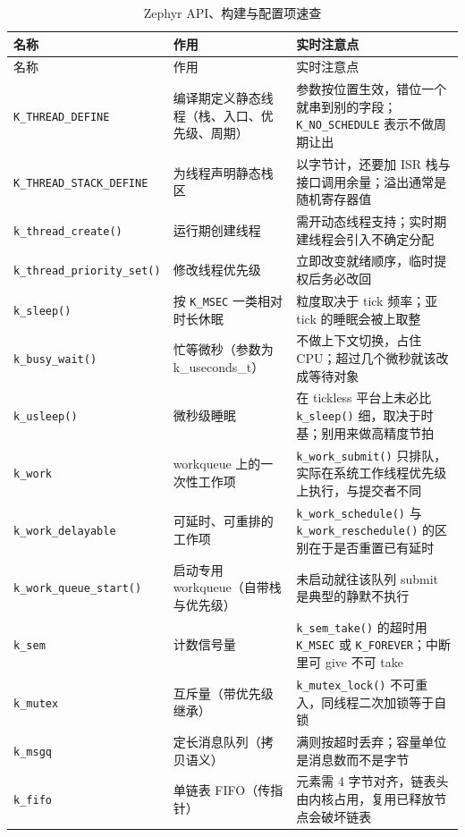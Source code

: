 \documentclass[12pt,a4paper,fontset=fandol]{ctexbook}
\newcommand{\Fn}[1]{\texttt{#1()}}
\newcommand{\Tp}[1]{\texttt{#1}}
\begin{document}
\begin{longtable}{>{\raggedright\arraybackslash\footnotesize}p{} >{\raggedright\arraybackslash\footnotesize}p{} >{\raggedright\arraybackslash\footnotesize}p{}}
\caption{Zephyr API、构建与配置项速查}\label{tab:apB-zephyr} \\
\toprule 名称 & 作用 & 实时注意点 \\ \midrule
\endfirsthead
\toprule 名称 & 作用 & 实时注意点 \\ \midrule
\endhead
\bottomrule \endfoot
\endlastfoot
\Tp{K\_THREAD\_DEFINE} & 编译期定义静态线程（栈、入口、优先级、周期） & 参数按位置生效，错位一个就串到别的字段；\Tp{K\_NO\_SCHEDULE} 表示不做周期让出 \\
\Tp{K\_THREAD\_STACK\_DEFINE} & 为线程声明静态栈区 & 以字节计，还要加 ISR 栈与接口调用余量；溢出通常是随机寄存器值 \\
\Fn{k\_thread\_create} & 运行期创建线程 & 需开动态线程支持；实时期建线程会引入不确定分配 \\
\Fn{k\_thread\_priority\_set} & 修改线程优先级 & 立即改变就绪顺序，临时提权后务必改回 \\
\Fn{k\_sleep} & 按 \Tp{K\_MSEC} 一类相对时长休眠 & 粒度取决于 tick 频率；亚 tick 的睡眠会被上取整 \\
\Fn{k\_busy\_wait} & 忙等微秒（参数为 k\_useconds\_t） & 不做上下文切换，占住 CPU；超过几个微秒就该改成等待对象 \\
\Fn{k\_usleep} & 微秒级睡眠 & 在 tickless 平台上未必比 \Fn{k\_sleep} 细，取决于时基；别用来做高精度节拍 \\
\Tp{k\_work} & workqueue 上的一次性工作项 & \Fn{k\_work\_submit} 只排队，实际在系统工作线程优先级上执行，与提交者不同 \\
\Tp{k\_work\_delayable} & 可延时、可重排的工作项 & \Fn{k\_work\_schedule} 与 \Fn{k\_work\_reschedule} 的区别在于是否重置已有延时 \\
\Fn{k\_work\_queue\_start} & 启动专用 workqueue（自带栈与优先级） & 未启动就往该队列 submit 是典型的静默不执行 \\
\Tp{k\_sem} & 计数信号量 & \Fn{k\_sem\_take} 的超时用 \Tp{K\_MSEC} 或 \Tp{K\_FOREVER}；中断里可 give 不可 take \\
\Tp{k\_mutex} & 互斥量（带优先级继承） & \Fn{k\_mutex\_lock} 不可重入，同线程二次加锁等于自锁 \\
\Tp{k\_msgq} & 定长消息队列（拷贝语义） & 满则按超时丢弃；容量单位是消息数而不是字节 \\
\Tp{k\_fifo} & 单链表 FIFO（传指针） & 元素需 4 字节对齐，链表头由内核占用，复用已释放节点会破坏链表 \\

\end{longtable}
\end{document}
